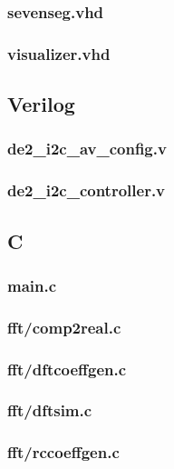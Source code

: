 \documentclass{article}
\begin{document}
	\subsubsection{sevenseg.vhd}
	
	\subsubsection{visualizer.vhd}
	

\subsection{Verilog}
	\subsubsection{de2\_i2c\_av\_config.v}
	
	\subsubsection{de2\_i2c\_controller.v}
	

\subsection{C}
	\subsubsection{main.c}
	
	\subsubsection{fft/comp2real.c}
	
	\subsubsection{fft/dftcoeffgen.c}
	
	\subsubsection{fft/dftsim.c}
	
	\subsubsection{fft/rccoeffgen.c}
	
\end{document}
